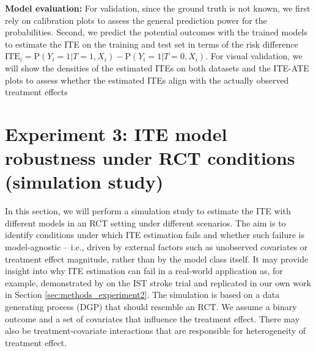 \textbf{Model evaluation: } For validation, since the ground truth is not known, we first rely on calibration plots to assess the general prediction power for the probabilities. Second, we predict the potential outcomes with the trained models to estimate the ITE on the training and test set in terms of the risk difference $\text{ITE}_i = \text{P}(Y_i=1|T=1, X_i) - \text{P}(Y_i=1|T=0, X_i)$. For visual validation, we will show the densities of the estimated ITEs on both datasets and the ITE-ATE plots to assess whether the estimated ITEs align with the actually observed treatment effects









\section{Experiment 3: ITE model robustness under RCT conditions (simulation study)}

In this section, we will perform a simulation study to estimate the ITE with different models in an RCT setting under different scenarios. The aim is to identify conditions under which ITE estimation fails and whether such failure is model-agnostic -- i.e., driven by external factors such as unobserved covariates or treatment effect magnitude, rather than by the model class itself. It may provide insight into why ITE estimation can fail in a real-world application as, for example, demonstrated by \citet{chen2025} on the IST stroke trial and replicated in our own work in Section \ref{sec:methods_experiment2}. The simulation is based on a data generating process (DGP) that should resemble an RCT. We assume a binary outcome and a set of covariates that influence the treatment effect. There may also be treatment-covariate interactions that are responsible for heterogeneity of treatment effect. 


